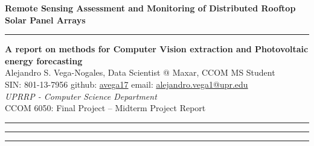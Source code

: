 \documentclass[a4paper,12pt]{article}
\begin{document}
\pagestyle{fancy}
\thispagestyle{empty}
\renewcommand*{\thefootnote}{\fnsymbol{footnote}}
\begin{center}
\Large{\textbf{Remote Sensing Assessment and Monitoring of Distributed Rooftop Solar Panel Arrays}}
\vspace{0.5cm}
{\color{gray}\hrule}
\medskip
\large\textbf{A report on methods for Computer Vision extraction and Photovoltaic energy forecasting} \\
\bigskip
\normalsize Alejandro S. Vega-Nogales, Data Scientist @ Maxar, CCOM MS Student \\
\vspace{0.1cm}
SIN: 801-13-7956 \quad github: \href{https://github.com/avega17}{avega17}  \quad email: \href{mailto:alejandro.vega1@upr.edu}{alejandro.vega1@upr.edu} \\
\vspace{0.1cm}
\textit{UPRRP - Computer Science Department} \\
\vspace{0.1cm}
CCOM 6050: Final Project -- Midterm Project Report
\medskip
\normalsize
\end{center}
{\color{gray}\hrule} 
\vspace{0.4cm} 

\tableofcontents
\hfill
\clearpage

\newcommand{\reportpath}{./assets/report/src}


{\color{gray}\hrule}
\clearpage

{\color{gray}\hrule}
\medskip




\clearpage


\end{document}
